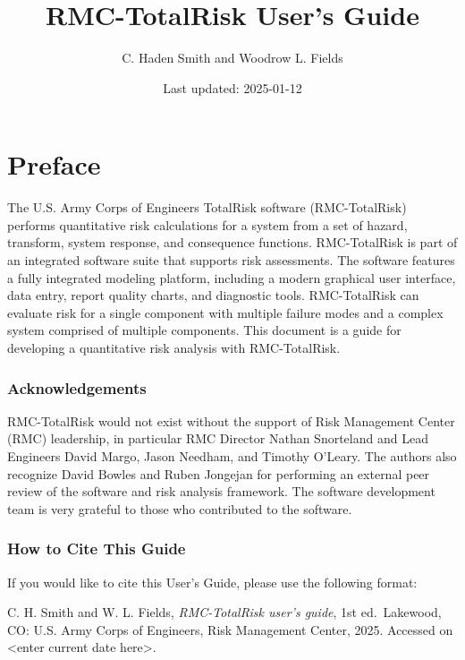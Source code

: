 \documentclass[
]{book}
\title{RMC-TotalRisk User's Guide}
\author{C. Haden Smith and Woodrow L. Fields}
\date{Last updated: 2025-01-12}
\begin{document}
\maketitle

{
\setcounter{tocdepth}{1}
\tableofcontents
}
\hypertarget{preface}{%
\chapter*{Preface}\label{preface}}

The U.S. Army Corps of Engineers TotalRisk software (RMC-TotalRisk) performs quantitative risk calculations for a system from a set of hazard, transform, system response, and consequence functions. RMC-TotalRisk is part of an integrated software suite that supports risk assessments. The software features a fully integrated modeling platform, including a modern graphical user interface, data entry, report quality charts, and diagnostic tools. RMC-TotalRisk can evaluate risk for a single component with multiple failure modes and a complex system comprised of multiple components. This document is a guide for developing a quantitative risk analysis with RMC-TotalRisk.

\hypertarget{acknowledgements}{%
\subsection*{Acknowledgements}\label{acknowledgements}}

RMC-TotalRisk would not exist without the support of Risk Management Center (RMC) leadership, in particular RMC Director Nathan Snorteland and Lead Engineers David Margo, Jason Needham, and Timothy O'Leary. The authors also recognize David Bowles and Ruben Jongejan for performing an external peer review of the software and risk analysis framework. The software development team is very grateful to those who contributed to the software.

\hypertarget{how-to-cite-this-guide}{%
\subsection*{How to Cite This Guide}\label{how-to-cite-this-guide}}

If you would like to cite this User's Guide, please use the following format:

\begin{citation-note}
C. H. Smith and W. L. Fields, \emph{RMC-TotalRisk user's guide}, 1st
ed.~Lakewood, CO: U.S. Army Corps of Engineers, Risk Management Center,
2025. Accessed on {\textless enter current date here\textgreater{}}.
\end{citation-note}
\end{document}
